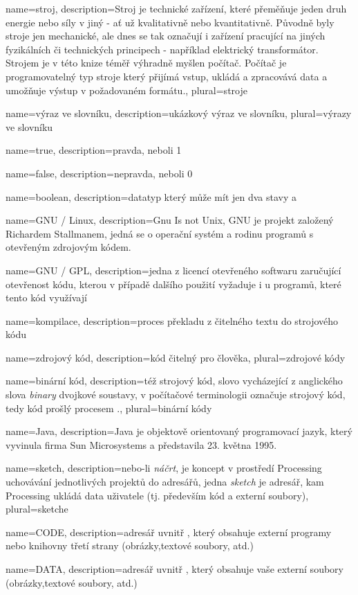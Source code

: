 {
  name={stroj},
  description={Stroj je technické zařízení, které přeměňuje jeden druh energie nebo síly v jiný - ať už kvalitativně nebo kvantitativně. Původně byly stroje jen mechanické, ale dnes se tak označují i zařízení pracující na jiných fyzikálních či technických principech - například elektrický transformátor. Strojem je v této knize téměř výhradně myšlen počítač. Počítač je programovatelný typ stroje který přijímá vstup, ukládá a zpracovává data a umožňuje výstup v požadovaném formátu.},
  plural={stroje}
}

{
  name={výraz ve slovníku},
  description={ukázkový výraz ve slovníku},
  plural={výrazy ve slovníku}
}


{
  name={true},
  description={pravda, neboli 1}
}

{
  name={false},
  description={nepravda, neboli 0}
}

{
  name={boolean},
  description={datatyp který může mít jen dva stavy  a }
}

{
  name={GNU / Linux},
  description={Gnu Is not Unix, GNU je projekt založený Richardem Stallmanem, jedná se o operační systém a rodinu programů s otevřeným zdrojovým kódem.}
}

{
  name={GNU / GPL},
  description={jedna z licencí otevřeného softwaru zaručující otevřenost kódu, kterou v případě dalšího použití vyžaduje i u programů, které tento kód využívají}
}


{
	name={kompilace},
	description={proces překladu z čitelného textu do strojového kódu}
}


{
	name={zdrojový kód},
	description={kód čitelný pro člověka},
	plural={zdrojové kódy}
}

{
	name={binární kód},
	description={též strojový kód, slovo vycházející z anglického slova {\em binary} dvojkové soustavy, v počítačové terminologii označuje strojový kód, tedy kód prošlý procesem .},
	plural={binární kódy}
}

{
	name={Java},
	description={Java je objektově orientovaný programovací jazyk, který vyvinula firma Sun Microsystems a představila 23. května 1995.}
}

{
	name={sketch},
	description={nebo-li {\em náčrt}, je koncept v prostředí Processing uchovávání jednotlivých projektů do adresářů, jedna {\em sketch} je adresář, kam Processing ukládá data uživatele (tj. především kód a externí soubory)},
	plural={sketche}
}

{
	name={CODE},
	description={adresář uvnitř , který obsahuje externí   programy nebo knihovny třetí strany (obrázky,textové soubory, atd.)}
}

{
	name={DATA},
	description={adresář uvnitř , který obsahuje vaše externí soubory (obrázky,textové soubory, atd.)}
}
